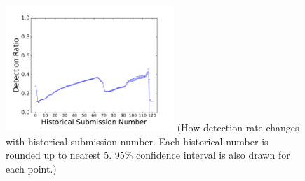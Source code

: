 

\begin{figure}[t!]
\begin{center}
\includegraphics[width=2.5in]{figure/SubNum}
  {\footnotesize{(How detection rate changes with historical submission number. 
Each historical number is rounded up to nearest 5.
95\% confidence interval is also drawn for each point.)}}
\end{center}
\end{figure}


